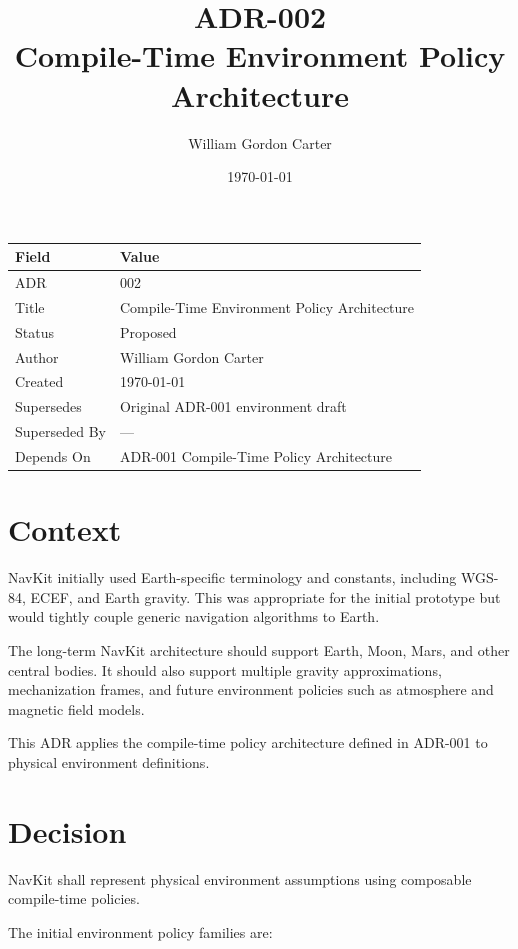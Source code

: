 \documentclass[11pt]{article}
\title{ADR-002\\Compile-Time Environment Policy Architecture}
\author{William Gordon Carter}
\date{\today}
\begin{document}
\maketitle

\begin{center}
\begin{tabular}{ll}
\toprule
\textbf{Field} & \textbf{Value} \\
\midrule
ADR & 002 \\
Title & Compile-Time Environment Policy Architecture \\
Status & Proposed \\
Author & William Gordon Carter \\
Created & \today \\
Supersedes & Original ADR-001 environment draft \\
Superseded By & --- \\
Depends On & ADR-001 Compile-Time Policy Architecture \\
\bottomrule
\end{tabular}
\end{center}

\tableofcontents
\newpage

\section{Context}

NavKit initially used Earth-specific terminology and constants, including
WGS-84, ECEF, and Earth gravity. This was appropriate for the initial prototype
but would tightly couple generic navigation algorithms to Earth.

The long-term NavKit architecture should support Earth, Moon, Mars, and other
central bodies. It should also support multiple gravity approximations,
mechanization frames, and future environment policies such as atmosphere and
magnetic field models.

This ADR applies the compile-time policy architecture defined in ADR-001 to
physical environment definitions.

\section{Decision}

NavKit shall represent physical environment assumptions using composable
compile-time policies.

The initial environment policy families are:
\end{document}
